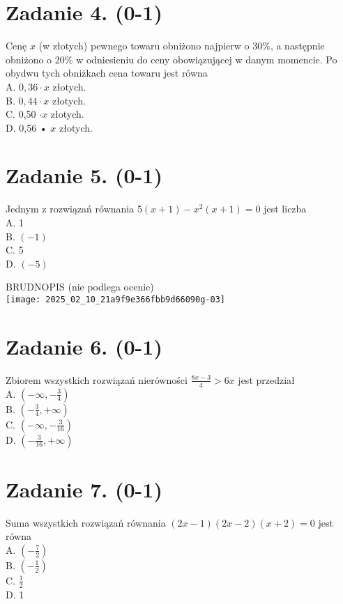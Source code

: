 \documentclass[10pt]{article}
\begin{document}
\section*{Zadanie 4. (0-1)}
Cenę \(x\) (w złotych) pewnego towaru obniżono najpierw o \(30 \%\), a następnie obniżono o \(20 \%\) w odniesieniu do ceny obowiązującej w danym momencie. Po obydwu tych obniżkach cena towaru jest równa\\
A. \(0,36 \cdot x\) złotych.\\
B. \(0,44 \cdot x\) złotych.\\
C. 0,50 \(\cdot x\) złotych.\\
D. 0,56 • \(x\) złotych.

\section*{Zadanie 5. (0-1)}
Jednym z rozwiązań równania \(5(x+1)-x^{2}(x+1)=0\) jest liczba\\
A. 1\\
B. \((-1)\)\\
C. 5\\
D. \((-5)\)

BRUDNOPIS (nie podlega ocenie)\\
\texttt{[image: 2025\_02\_10\_21a9f9e366fbb9d66090g-03]}

\section*{Zadanie 6. (0-1)}
Zbiorem wszystkich rozwiązań nierówności \(\frac{8 x-3}{4}>6 x\) jest przedział\\
A. \(\left(-\infty,-\frac{3}{4}\right)\)\\
B. \(\left(-\frac{3}{4},+\infty\right)\)\\
C. \(\left(-\infty,-\frac{3}{16}\right)\)\\
D. \(\left(-\frac{3}{16},+\infty\right)\)

\section*{Zadanie 7. (0-1)}
Suma wszystkich rozwiązań równania \((2 x-1)(2 x-2)(x+2)=0\) jest równa\\
A. \(\left(-\frac{7}{2}\right)\)\\
B. \(\left(-\frac{1}{2}\right)\)\\
C. \(\frac{1}{2}\)\\
D. 1
\end{document}
